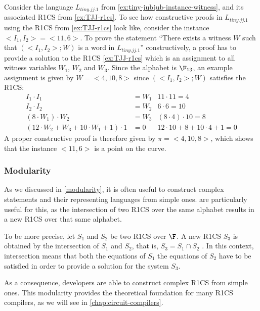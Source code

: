 \begin{example}\label{ex:tiny-jubjub-r1cs} Consider the language $L_{tiny.jj.1}$ from \examplename{} \ref{ex:tiny-jubjub-instance-witness}, and its associated R1CS from \examplename{} \ref{ex:TJJ-r1cs}. To see how constructive proofs in $L_{tiny.jj.1}$ using the R1CS from \examplename{} \ref{ex:TJJ-r1cs} look like, consider the instance $<I_1,I_2>= <11,6>$. To prove the statement ``There exists a witness $W$ such that $(<I_1,I_2>;W)$ is a word in $L_{tiny.jj.1}$'' constructively, a proof has to provide a solution to the R1CS \ref{ex:TJJ-r1cs} which is an assignment to all witness variables $W_1$, $W_2$ and $W_3$. Since the alphabet is $\F_{13}$, an example assignment is given by
$W=<4,10,8>$ since $(<I_1,I_2>;W)$ satisfies the R1CS:
\begin{align*}
I_1 \cdot I_1 & = W_1 & 11\cdot 11 = 4\\
I_2 \cdot I_2 & = W_2 & 6 \cdot 6 = 10 \\
(8 \cdot W_1) \cdot W_2 & = W_3 & (8\cdot 4)\cdot 10 = 8\\
(12\cdot W_2 + W_3 + 10\cdot W_1 + 1)\cdot 1 & = 0 & 12\cdot 10 + 8 + 10\cdot 4 + 1 = 0
\end{align*}
A proper constructive proof is therefore given by $\pi=<4,10,8>$, which shows that the instance $<11,6>$ is a point on the  curve. 
\end{example}
\subsubsection{Modularity}
\label{sec:R1CS_modularity} As we discussed in \ref{modularity}, it is often useful to construct complex statements and their representing languages from simple ones.  are particularly useful for this, as the intersection of two R1CS over the same alphabet results in a new R1CS over that same alphabet. 

To be more precise, let $S_1$ and $S_2$ be two R1CS over $\F$. A new R1CS $S_3$ is obtained by the intersection of $S_1$ and $S_2$, that is, $S_3 = S_1\cap S_2$ . In this context, intersection means that both the equations of $S_1$  the equations of $S_2$ have to be satisfied in order to provide a solution for the system $S_3$.

As a consequence, developers are able to construct complex R1CS from simple ones. This modularity provides the theoretical foundation for many R1CS compilers, as we will see in \chaptname{} \ref{chap:circuit-compilers}.


